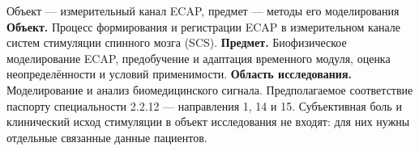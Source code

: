 \begin{frame}{Объект --- измерительный канал ECAP, предмет --- методы его моделирования}
\textbf{Объект.} Процесс формирования и регистрации ECAP в измерительном канале систем стимуляции спинного мозга (SCS).
\SlideGap
\textbf{Предмет.} Биофизическое моделирование ECAP, предобучение и адаптация временного модуля, оценка неопределённости и условий применимости.
\SlideGap
\textbf{Область исследования.} Моделирование и анализ биомедицинского сигнала. Предполагаемое соответствие паспорту специальности 2.2.12 --- направления 1, 14 и 15.
\SlideGap
Субъективная боль и клинический исход стимуляции в объект исследования не входят: для них нужны отдельные связанные данные пациентов.
\end{frame}
